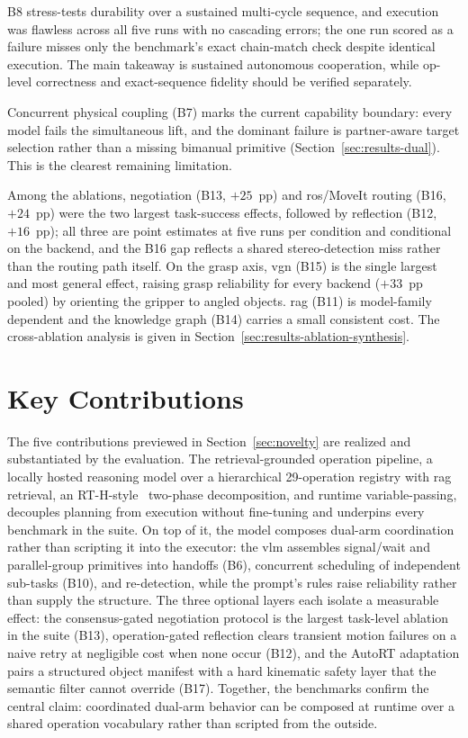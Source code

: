 \documentclass[
     12pt,
     a4paper,
     BCOR=10mm,
     DIV=14,
     listof=totoc,
     bibliography=totoc,
     parskip,
     twoside,
     headsepline
     ]{scrreprt}
\begin{document}
B8 stress-tests durability over a sustained multi-cycle sequence, and execution was flawless across all five runs with no cascading errors; the one run scored as a failure misses only the benchmark's exact chain-match check despite identical execution. The main takeaway is sustained autonomous cooperation, while op-level correctness and exact-sequence fidelity should be verified separately.

Concurrent physical coupling (B7) marks the current capability boundary: every model fails the simultaneous lift, and the dominant failure is partner-aware target selection rather than a missing bimanual primitive (Section~\ref{sec:results-dual}). This is the clearest remaining limitation.

Among the ablations, negotiation (B13, $+25$~pp) and \gls{ros}/MoveIt routing (B16, $+24$~pp) were the two largest task-success effects, followed by reflection (B12, $+16$~pp); all three are point estimates at five runs per condition and conditional on the backend, and the B16 gap reflects a shared stereo-detection miss rather than the routing path itself. On the grasp axis, \gls{vgn} (B15) is the single largest and most general effect, raising grasp reliability for every backend ($+33$~pp pooled) by orienting the gripper to angled objects. \gls{rag} (B11) is model-family dependent and the knowledge graph (B14) carries a small consistent cost. The cross-ablation analysis is given in Section~\ref{sec:results-ablation-synthesis}.

\section{Key Contributions}
The five contributions previewed in Section~\ref{sec:novelty} are realized and substantiated by the evaluation. The retrieval-grounded operation pipeline, a locally hosted reasoning model over a hierarchical 29-operation registry with \gls{rag} retrieval, an RT-H-style~\cite{belkhale2024rthactionhierarchiesusing} two-phase decomposition, and runtime variable-passing, decouples planning from execution without fine-tuning and underpins every benchmark in the suite. On top of it, the model composes dual-arm coordination rather than scripting it into the executor: the \gls{vlm} assembles signal/wait and parallel-group primitives into handoffs (B6), concurrent scheduling of independent sub-tasks (B10), and re-detection, while the prompt's rules raise reliability rather than supply the structure. The three optional layers each isolate a measurable effect: the consensus-gated negotiation protocol is the largest task-level ablation in the suite (B13), operation-gated reflection clears transient motion failures on a naive retry at negligible cost when none occur (B12), and the AutoRT adaptation pairs a structured object manifest with a hard kinematic safety layer that the semantic filter cannot override (B17). Together, the benchmarks confirm the central claim: coordinated dual-arm behavior can be composed at runtime over a shared operation vocabulary rather than scripted from the outside.
\end{document}
